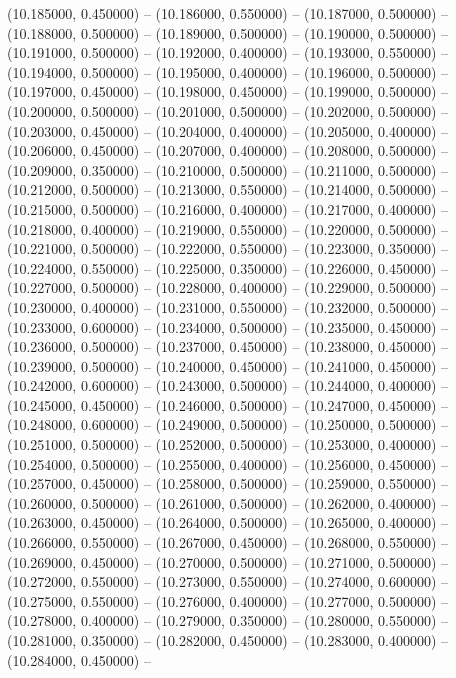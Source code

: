 (10.185000, 0.450000) -- 
(10.186000, 0.550000) -- 
(10.187000, 0.500000) -- 
(10.188000, 0.500000) -- 
(10.189000, 0.500000) -- 
(10.190000, 0.500000) -- 
(10.191000, 0.500000) -- 
(10.192000, 0.400000) -- 
(10.193000, 0.550000) -- 
(10.194000, 0.500000) -- 
(10.195000, 0.400000) -- 
(10.196000, 0.500000) -- 
(10.197000, 0.450000) -- 
(10.198000, 0.450000) -- 
(10.199000, 0.500000) -- 
(10.200000, 0.500000) -- 
(10.201000, 0.500000) -- 
(10.202000, 0.500000) -- 
(10.203000, 0.450000) -- 
(10.204000, 0.400000) -- 
(10.205000, 0.400000) -- 
(10.206000, 0.450000) -- 
(10.207000, 0.400000) -- 
(10.208000, 0.500000) -- 
(10.209000, 0.350000) -- 
(10.210000, 0.500000) -- 
(10.211000, 0.500000) -- 
(10.212000, 0.500000) -- 
(10.213000, 0.550000) -- 
(10.214000, 0.500000) -- 
(10.215000, 0.500000) -- 
(10.216000, 0.400000) -- 
(10.217000, 0.400000) -- 
(10.218000, 0.400000) -- 
(10.219000, 0.550000) -- 
(10.220000, 0.500000) -- 
(10.221000, 0.500000) -- 
(10.222000, 0.550000) -- 
(10.223000, 0.350000) -- 
(10.224000, 0.550000) -- 
(10.225000, 0.350000) -- 
(10.226000, 0.450000) -- 
(10.227000, 0.500000) -- 
(10.228000, 0.400000) -- 
(10.229000, 0.500000) -- 
(10.230000, 0.400000) -- 
(10.231000, 0.550000) -- 
(10.232000, 0.500000) -- 
(10.233000, 0.600000) -- 
(10.234000, 0.500000) -- 
(10.235000, 0.450000) -- 
(10.236000, 0.500000) -- 
(10.237000, 0.450000) -- 
(10.238000, 0.450000) -- 
(10.239000, 0.500000) -- 
(10.240000, 0.450000) -- 
(10.241000, 0.450000) -- 
(10.242000, 0.600000) -- 
(10.243000, 0.500000) -- 
(10.244000, 0.400000) -- 
(10.245000, 0.450000) -- 
(10.246000, 0.500000) -- 
(10.247000, 0.450000) -- 
(10.248000, 0.600000) -- 
(10.249000, 0.500000) -- 
(10.250000, 0.500000) -- 
(10.251000, 0.500000) -- 
(10.252000, 0.500000) -- 
(10.253000, 0.400000) -- 
(10.254000, 0.500000) -- 
(10.255000, 0.400000) -- 
(10.256000, 0.450000) -- 
(10.257000, 0.450000) -- 
(10.258000, 0.500000) -- 
(10.259000, 0.550000) -- 
(10.260000, 0.500000) -- 
(10.261000, 0.500000) -- 
(10.262000, 0.400000) -- 
(10.263000, 0.450000) -- 
(10.264000, 0.500000) -- 
(10.265000, 0.400000) -- 
(10.266000, 0.550000) -- 
(10.267000, 0.450000) -- 
(10.268000, 0.550000) -- 
(10.269000, 0.450000) -- 
(10.270000, 0.500000) -- 
(10.271000, 0.500000) -- 
(10.272000, 0.550000) -- 
(10.273000, 0.550000) -- 
(10.274000, 0.600000) -- 
(10.275000, 0.550000) -- 
(10.276000, 0.400000) -- 
(10.277000, 0.500000) -- 
(10.278000, 0.400000) -- 
(10.279000, 0.350000) -- 
(10.280000, 0.550000) -- 
(10.281000, 0.350000) -- 
(10.282000, 0.450000) -- 
(10.283000, 0.400000) -- 
(10.284000, 0.450000) -- 
